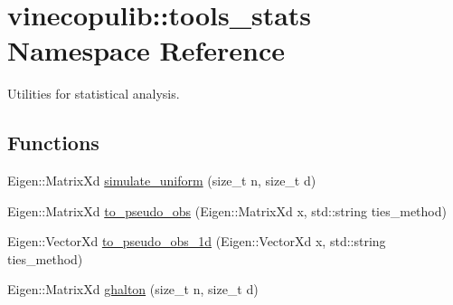 \hypertarget{namespacevinecopulib_1_1tools__stats}{}\section{vinecopulib\+:\+:tools\+\_\+stats Namespace Reference}
\label{namespacevinecopulib_1_1tools__stats}


Utilities for statistical analysis.  


\subsection*{Functions}
\begin{DoxyCompactItemize}
\item 
Eigen\+::\+Matrix\+Xd \hyperlink{namespacevinecopulib_1_1tools__stats_a78efaf3caf538201cdb881dd2780b242}{simulate\+\_\+uniform} (size\+\_\+t n, size\+\_\+t d)
\item 
Eigen\+::\+Matrix\+Xd \hyperlink{namespacevinecopulib_1_1tools__stats_afda41507cee7cba84602e28e56cfcd99}{to\+\_\+pseudo\+\_\+obs} (Eigen\+::\+Matrix\+Xd x, std\+::string ties\+\_\+method)
\item 
Eigen\+::\+Vector\+Xd \hyperlink{namespacevinecopulib_1_1tools__stats_a9e4849a2a908703a68e92e0c0633237f}{to\+\_\+pseudo\+\_\+obs\+\_\+1d} (Eigen\+::\+Vector\+Xd x, std\+::string ties\+\_\+method)
\item 
Eigen\+::\+Matrix\+Xd \hyperlink{namespacevinecopulib_1_1tools__stats_ae0ba8000d0941c82677df06ce6d1d564}{ghalton} (size\+\_\+t n, size\+\_\+t d)
\end{DoxyCompactItemize}
